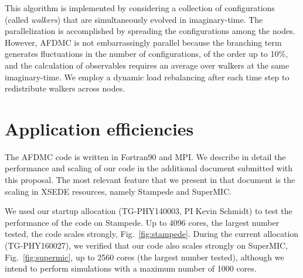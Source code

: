 \documentclass[12pt,letterpaper]{article}
\begin{document}
This algorithm is implemented by considering
a collection of configurations (called \textit{walkers})
that are simultaneously evolved in imaginary-time. The parallelization is 
accomplished
by spreading the configurations among the nodes. However, AFDMC is not 
embarrassingly parallel because the branching term generates fluctuations in 
the number of configurations, of the order up to 10\%, and the calculation 
of observables requires an average over walkers at the same imaginary-time. 
We employ a dynamic load rebalancing after
each time step to redistribute walkers across nodes.

\section{Application efficiencies}

The AFDMC code is written in Fortran90 and MPI. We describe in detail the 
performance and scaling of our code in the additional document submitted 
with this proposal. The most relevant feature that we present in that 
document is the scaling in XSEDE resources, namely Stampede and SuperMIC.

We used our startup allocation (TG-PHY140003, PI Kevin Schmidt) to test the 
performance of the code on Stampede. Up to 4096 cores, the 
largest number tested, the code scales strongly, Fig.~\ref{fig:stampede}.
During the current allocation (TG-PHY160027), we verified that our code also 
scales strongly on SuperMIC, Fig.~\ref{fig:supermic}, up to 2560 cores (the 
largest number tested), although we intend to perform 
simulations with a maximum number of 1000 cores.
\end{document}
